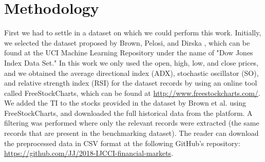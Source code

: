 \documentclass[a4paper,twoside]{article}
\begin{document}



\section{Methodology}
\label{proposed-method}


First we had to settle in a dataset on which we could perform this
work. Initially, we selected the dataset proposed  by Brown, Pelosi, and
Dirska \cite{brown2013dynamic}, which can be found at the UCI Machine
Learning Repository under the name of "Dow Jones Index Data Set." %
In
this work we only used the open, high, low, and close prices, and we
obtained the average directional index (ADX), stochastic oscillator
(SO), and relative strength index (RSI) for the dataset records by
using an online tool called FreeStockCharts, which can be found at
\url{http://www.freestockcharts.com/}. We added the TI to the stocks
provided in the dataset by Brown et al. using FreeStockCharts, and
downloaded the full historical data from the platform. A filtering was
performed where only the relevant records were extracted (the same
records that are present in the benchmarking dataset). The reader can
download the preprocessed data in CSV format at the following GitHub's
repository: \url{https://github.com/JJ/2018-IJCCI-financial-markets}. 
\end{document}
